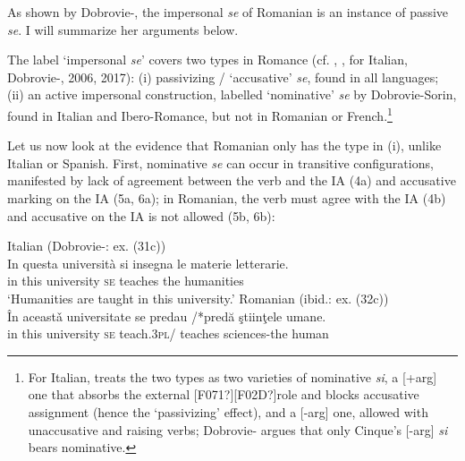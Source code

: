 \documentclass[output=paper]{langsci/langscibook}
\begin{document}
As shown by Dobrovie-\citet{Sorin1998}, the impersonal \textit{se} of Romanian is an instance of passive \textit{se}. I will summarize her arguments below.

The label ‘impersonal \textit{se}’ covers two types in Romance (cf. \citealt{Belletti1982}, \citealt{Manzini1986}, \citealt{Burzio1986} for Italian, Dobrovie-\citealt{Sorin1998}, 2006, 2017): (i) passivizing / ‘accusative’ \textit{se}, found in all languages; (ii) an active impersonal construction, labelled ‘nominative’ \textit{se} by Dobrovie-Sorin, found in Italian and Ibero-Romance, but not in Romanian or French.\footnote{For Italian, \citet{Cinque1988} treats the two types as two varieties of nominative \textit{si}, a [+arg] one that absorbs the external [F071?][F02D?]role and blocks accusative assignment (hence the ‘passivizing’ effect), and a [-arg] one, allowed with unaccusative and  raising verbs; Dobrovie-\citet{Sorin1998} argues that only Cinque’s [-arg] \textit{si} bears nominative.} 

Let us now look at the evidence that Romanian only has the type in (i), unlike Italian or Spanish. First, nominative \textit{se} can occur in transitive configurations, manifested by lack of agreement between the verb and the IA (4a) and accusative marking on the IA (5a, 6a); in Romanian, the verb must agree with the IA (4b) and accusative on the IA is not allowed (5b, 6b):

\ea%
    \label{ex:giurgea:4}
    \ea  Italian (Dobrovie-\citealt{Sorin2017}: ex. (31c))\\
    \gll In questa università  si    insegna  le   materie letterarie.\\
         in this      university \textsc{se}   teaches   the humanities\\
    \glt ‘Humanities are taught in this university.’
    \ex Romanian (ibid.: ex. (32c))\\
    \gll În aceastǎ universitate se   predau   /*predă     ştiinţele        umane.\\
         in this      university     \textsc{se}  teach.3\textsc{pl}/ teaches  sciences-the human \\
    \z
\z

\ea%
    \label{ex:giurgea:5}
    \z
\z    
\end{document}
